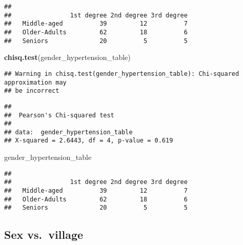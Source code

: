 \documentclass[
]{article}
\newenvironment{Shaded}{\begin{snugshade}}{\end{snugshade}}
\newcommand{\CommentTok}[1]{\textcolor[rgb]{0.56,0.35,0.01}{\textit{#1}}}
\newcommand{\FunctionTok}[1]{\textcolor[rgb]{0.13,0.29,0.53}{\textbf{#1}}}
\newcommand{\NormalTok}[1]{#1}
\newcommand{\OtherTok}[1]{\textcolor[rgb]{0.56,0.35,0.01}{#1}}
\newcommand{\SpecialCharTok}[1]{\textcolor[rgb]{0.81,0.36,0.00}{\textbf{#1}}}
\begin{document}
\begin{verbatim}
##               
##                1st degree 2nd degree 3rd degree
##   Middle-aged          39         12          7
##   Older-Adults         62         18          6
##   Seniors              20          5          5
\end{verbatim}

\begin{Shaded}
\begin{Highlighting}[]
\FunctionTok{chisq.test}\NormalTok{(gender\_hypertension\_table)}
\end{Highlighting}
\end{Shaded}

\begin{verbatim}
## Warning in chisq.test(gender_hypertension_table): Chi-squared approximation may
## be incorrect
\end{verbatim}

\begin{verbatim}
## 
##  Pearson's Chi-squared test
## 
## data:  gender_hypertension_table
## X-squared = 2.6443, df = 4, p-value = 0.619
\end{verbatim}

\begin{Shaded}
\begin{Highlighting}[]
\NormalTok{gender\_hypertension\_table }
\end{Highlighting}
\end{Shaded}

\begin{verbatim}
##               
##                1st degree 2nd degree 3rd degree
##   Middle-aged          39         12          7
##   Older-Adults         62         18          6
##   Seniors              20          5          5
\end{verbatim}

\subsection{Sex vs.~village}\label{sex-vs.-village}

\begin{Shaded}
\end{Shaded}
\end{document}
